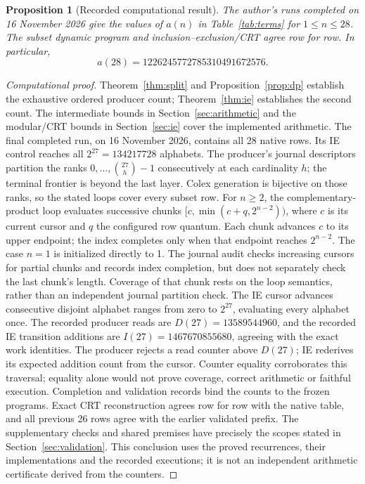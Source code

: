 \documentclass[11pt]{article}
\newtheorem{proposition}[theorem]{Proposition}
\theoremstyle{definition}
\theoremstyle{remark}
\begin{document}
\begin{proposition}[Recorded computational result]
\label{prop:result}
The author's runs completed on 16 November 2026 give the values of $a(n)$
in Table~\ref{tab:terms} for $1\leq n\leq28$.
The subset dynamic program and inclusion--exclusion/CRT agree row for row.
In particular,
\[
 a(28)=1226245772785310491672576.
\]
\end{proposition}
\begin{proof}[Computational proof]
Theorem~\ref{thm:split} and Proposition~\ref{prop:dp} establish the
exhaustive ordered producer count; Theorem~\ref{thm:ie} establishes the
second count. The intermediate bounds in Section~\ref{sec:arithmetic}
and the modular/CRT bounds in Section~\ref{sec:ie} cover the implemented
arithmetic. The final completed run, on 16 November 2026, contains all
28 native rows. Its IE control reaches all $2^{27}=134217728$ alphabets.
The producer's journal descriptors partition the ranks
$0,\ldots,\binom{27}{h}-1$ consecutively at each cardinality $h$;
the terminal frontier is beyond the last layer. Colex generation is
bijective on those ranks, so the stated loops cover every subset row.
For $n\geq2$, the complementary-product loop evaluates successive chunks
$[c,\min(c+q,2^{n-2}))$, where $c$ is its current cursor and $q$ the
configured row quantum. Each chunk advances $c$ to its upper endpoint;
the index completes only when that endpoint reaches $2^{n-2}$.
The case $n=1$ is initialized directly to 1.
The journal audit checks increasing cursors for partial chunks and records
index completion, but does not separately check the last chunk's length.
Coverage of that chunk rests on the loop semantics, rather than an
independent journal partition check.
The IE cursor advances consecutive disjoint alphabet ranges from zero
to $2^{27}$, evaluating every alphabet once. The recorded producer reads
are $D(27)=13589544960$, and the recorded IE transition additions are
$I(27)=1467670855680$, agreeing with the exact work identities.
The producer rejects a read counter above $D(27)$; IE rederives its
expected addition count from the cursor. Counter equality corroborates
this traversal; equality alone would not prove coverage, correct arithmetic
or faithful execution. Completion and validation records bind the counts
to the frozen programs. Exact CRT reconstruction agrees
row for row with the native table, and all previous 26 rows agree with
the earlier validated prefix. The supplementary checks and shared premises
have precisely the scopes stated in Section~\ref{sec:validation}.
This conclusion uses the proved recurrences, their implementations and
the recorded executions; it is not an independent arithmetic certificate
derived from the counters.
\end{proof}
\end{document}
